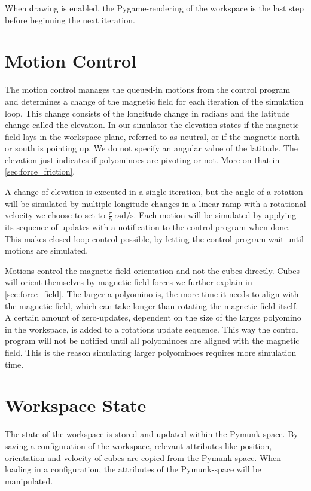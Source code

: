 When drawing is enabled, the Pygame-rendering of the workspace is the last step before beginning the next iteration.


\section{Motion Control}
\label{sec:motion_control}

The motion control manages the queued-in motions from the control program and determines a change of the magnetic field for each iteration of the simulation loop.
This change consists of the longitude change in radians and the latitude change called the elevation.
In our simulator the elevation states if the magnetic field lays in the workspace plane, referred to as neutral, or if the magnetic north or south is pointing up.
We do not specify an angular value of the latitude.
The elevation just indicates if polyominoes are pivoting or not.
More on that in \autoref{sec:force_friction}.

A change of elevation is executed in a single iteration, but the angle of a rotation will be simulated by multiple longitude changes in a linear ramp with a rotational velocity we choose to set to $\frac{\pi}{8} \, \text{rad}/\text{s}$.
Each motion will be simulated by applying its sequence of updates with a notification to the control program when done.
This makes closed loop control possible, by letting the control program wait until motions are simulated.

Motions control the magnetic field orientation and not the cubes directly.
Cubes will orient themselves by magnetic field forces we further explain in \autoref{sec:force_field}.
The larger a polyomino is, the more time it needs to align with the magnetic field, which can take longer than rotating the magnetic field itself.
A certain amount of zero-updates, dependent on the size of the larges polyomino in the workspace, is added to a rotations update sequence.
This way the control program will not be notified until all polyominoes are aligned with the magnetic field.
This is the reason simulating larger polyominoes requires more simulation time.

\section{Workspace State}
\label{sec:workspace_state}

The state of the workspace is stored and updated within the Pymunk-space.
By saving a configuration of the workspace, relevant attributes like position, orientation and velocity of cubes are copied from the Pymunk-space.
When loading in a configuration, the attributes of the Pymunk-space will be manipulated.

